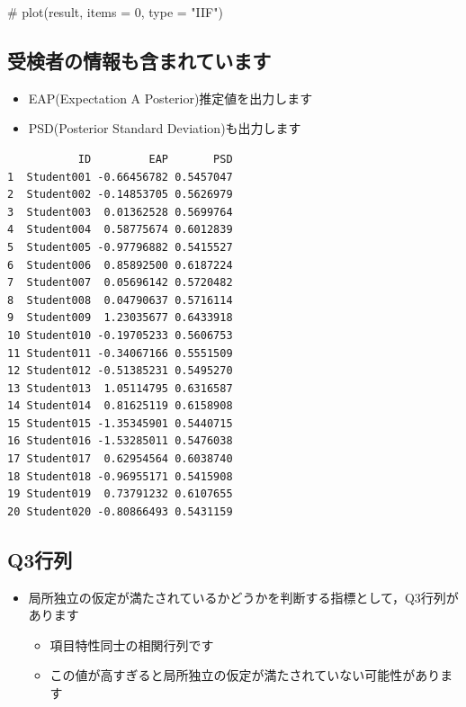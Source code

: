 \documentclass[
  a4paper,
]{ltjsbook}
\newenvironment{Shaded}{\begin{snugshade}}{\end{snugshade}}
\newcommand{\CommentTok}[1]{\textcolor[rgb]{0.37,0.37,0.37}{#1}}
\newcommand{\DecValTok}[1]{\textcolor[rgb]{0.68,0.00,0.00}{#1}}
\newcommand{\FunctionTok}[1]{\textcolor[rgb]{0.28,0.35,0.67}{#1}}
\newcommand{\NormalTok}[1]{\textcolor[rgb]{0.00,0.23,0.31}{#1}}
\newcommand{\SpecialCharTok}[1]{\textcolor[rgb]{0.37,0.37,0.37}{#1}}
\providecommand{\tightlist}{%
  \setlength{\itemsep}{0pt}\setlength{\parskip}{0pt}}\usepackage{longtable,booktabs,array}
\begin{document}
\begin{Shaded}
\begin{Highlighting}[]
\CommentTok{\# plot(result, items = 0, type = "IIF")}
\end{Highlighting}
\end{Shaded}

\subsection{受検者の情報も含まれています}\label{ux53d7ux691cux8005ux306eux60c5ux5831ux3082ux542bux307eux308cux3066ux3044ux307eux3059}

\begin{itemize}
\tightlist
\item
  EAP(Expectation A Posterior)推定値を出力します
\item
  PSD(Posterior Standard Deviation)も出力します
\end{itemize}

\begin{Shaded}
\end{Shaded}

\begin{verbatim}
           ID         EAP       PSD
1  Student001 -0.66456782 0.5457047
2  Student002 -0.14853705 0.5626979
3  Student003  0.01362528 0.5699764
4  Student004  0.58775674 0.6012839
5  Student005 -0.97796882 0.5415527
6  Student006  0.85892500 0.6187224
7  Student007  0.05696142 0.5720482
8  Student008  0.04790637 0.5716114
9  Student009  1.23035677 0.6433918
10 Student010 -0.19705233 0.5606753
11 Student011 -0.34067166 0.5551509
12 Student012 -0.51385231 0.5495270
13 Student013  1.05114795 0.6316587
14 Student014  0.81625119 0.6158908
15 Student015 -1.35345901 0.5440715
16 Student016 -1.53285011 0.5476038
17 Student017  0.62954564 0.6038740
18 Student018 -0.96955171 0.5415908
19 Student019  0.73791232 0.6107655
20 Student020 -0.80866493 0.5431159
\end{verbatim}

\subsection{Q3行列}\label{q3ux884cux5217}

\begin{itemize}
\tightlist
\item
  局所独立の仮定が満たされているかどうかを判断する指標として，Q3行列があります

  \begin{itemize}
  \tightlist
  \item
    項目特性同士の相関行列です
  \item
    この値が高すぎると局所独立の仮定が満たされていない可能性があります
  \end{itemize}
\end{itemize}
\end{document}
